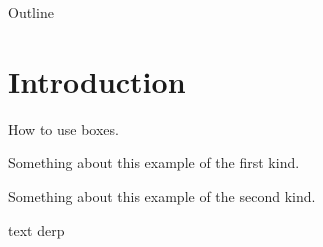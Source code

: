 


\begin{frame}
  \titlepage
\end{frame}

\begin{frame}{Outline}
  \tableofcontents
\end{frame}

\section{Introduction}

\begin{frame}{How to use boxes.}
\begin{blueblock}
  Something about this example of the first kind.
\end{blueblock}
\begin{orangeblock}
  Something about this example of the second kind.
\end{orangeblock}
\textcolor{ReneOrange}{text} derp

\end{frame}



 